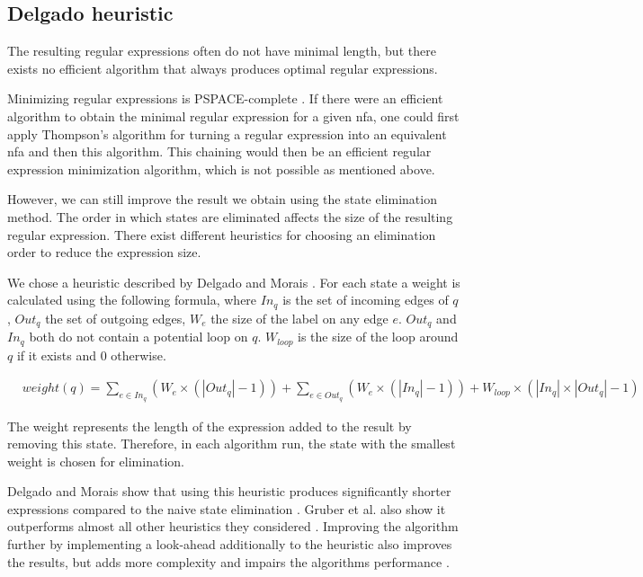 \subsection{Delgado heuristic}\label{sec:delgado}

The resulting regular expressions often do not have minimal length, but there exists no efficient algorithm that always produces optimal regular expressions.

Minimizing regular expressions is PSPACE-complete \cite{minimizing_nfa}.
If there were an efficient algorithm to obtain the minimal regular expression for a given \ac{nfa}, one could first apply Thompson's algorithm\cite{thompson} for turning a regular expression into an equivalent \ac{nfa} and then this algorithm. This chaining would then be an efficient regular expression minimization algorithm, which is not possible as mentioned above.

However, we can still improve the result we obtain using the state elimination method.
The order in which states are eliminated affects the size of the resulting regular expression. There exist different heuristics for choosing an elimination order to reduce the expression size.

We chose a heuristic described by Delgado and Morais \cite{delgado}.
For each state a weight is calculated using the following formula, where $In_q$ is the set of incoming edges of $q$, $Out_q$ the set of outgoing edges, $W_e$ the size of the label on any edge $e$. $Out_q$ and $In_q$ both do not contain a potential loop on $q$. $W_{loop}$ is the size of the loop around $q$ if it exists and $0$ otherwise. 

\begin{align*}
	&weight(q) = \sum_{e \in In_q} (W_{e} \times (|Out_q| - 1)) + \sum_{e \in Out_q} (W_{e} \times (|In_q| - 1)) + W_{loop} \times (|In_q| \times |Out_q| - 1)
\end{align*}

The weight represents the length of the expression added to the result by removing this state.
Therefore, in each algorithm run, the state with the smallest weight is chosen for elimination.

Delgado and Morais show that using this heuristic produces significantly shorter expressions compared to the naive state elimination \cite{delgado}. Gruber et al. also show it outperforms almost all other heuristics they considered \cite{gruber}.
Improving the algorithm further by implementing a look-ahead additionally to the heuristic also improves the results, but adds more complexity and impairs the algorithms performance \cite{delgado}.

